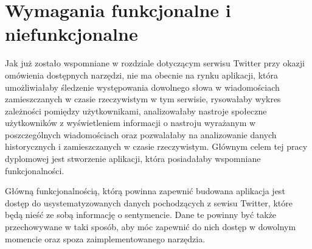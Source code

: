 \chapter{Wymagania funkcjonalne i niefunkcjonalne}
\qquad Jak już zostało wspomniane w rozdziale dotyczącym serwisu Twitter przy okazji omówienia dostępnych narzędzi, nie ma obecnie na rynku aplikacji, która umożliwiałaby śledzenie występowania dowolnego słowa w wiadomościach zamieszczanych w czasie rzeczywistym w tym serwisie, rysowałaby wykres zależności pomiędzy użytkownikami, analizowałaby nastroje społeczne użytkowników z wyświetleniem informacji o nastroju wyrażanym w poszczególnych wiadomościach oraz pozwalałaby na analizowanie danych historycznych i zamieszczanych w czasie rzeczywistym. Głównym celem tej pracy dyplomowej jest stworzenie aplikacji, która posiadałaby wspomniane funkcjonalności.

Główną funkcjonalnością, którą powinna zapewnić budowana aplikacja jest dostęp do usystematyzowanych danych pochodzących z sewisu Twitter, które będą nieść ze sobą informację o sentymencie. Dane te powinny być także przechowywane w taki sposób, aby móc zapewnić do nich dostęp w dowolnym momencie oraz spoza zaimplementowanego narzędzia.

